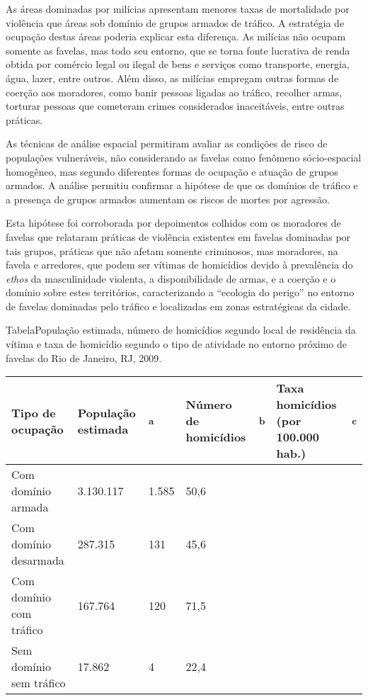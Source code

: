 \documentclass{article}
\begin{document}
As áreas dominadas por milícias apresentam menores taxas de mortalidade por
violência que áreas sob domínio de grupos armados de tráfico. A estratégia de
ocupação destas áreas poderia explicar esta diferença. As milícias não ocupam
somente as favelas, mas todo seu entorno, que se torna fonte lucrativa de renda
obtida por comércio legal ou ilegal de bens e serviços como transporte, energia,
água, lazer, entre outros. Além disso, as milícias empregam outras formas de
coerção aos moradores, como banir pessoas ligadas ao tráfico, recolher armas,
torturar pessoas que cometeram crimes considerados inaceitáveis, entre outras
práticas.

As técnicas de análise espacial permitiram avaliar as condições de risco de
populações vulneráveis, não considerando as favelas como fenômeno sócio-espacial
homogêneo, mas segundo diferentes formas de ocupação e atuação de grupos
armados. A análise permitiu confirmar a hipótese de que os domínios de tráfico e
a presença de grupos armados aumentam os riscos de mortes por agressão.

Esta hipótese foi corroborada por depoimentos colhidos com os moradores de
favelas que relataram práticas de violência existentes em favelas dominadas por
tais grupos, práticas que não afetam somente criminosos, mas moradores, na
favela e arredores, que podem ser vítimas de homicídios devido à prevalência do
\textit{ethos}
da masculinidade violenta, a disponibilidade de armas, e a coerção e o domínio
sobre estes territórios, caracterizando a “ecologia do perigo” no entorno de
favelas dominadas pelo tráfico e localizadas em zonas estratégicas da cidade.

TabelaPopulação estimada, número de homicídios segundo local de residência da
vítima e taxa de homicídio segundo o tipo de atividade no entorno próximo de
favelas do Rio de Janeiro, RJ, 2009.
\begin{table}
\begin{xtabular}{ l | l | l | l | l | l | l }
\hline
Tipo de ocupação & População estimada & \textsuperscript{a}
& Número de homicídios & \textsuperscript{b}
& Taxa homicídios (por 100.000 hab.) & \textsuperscript{c}
\\ \hline
Com domínio armada
& 3.130.117
& 1.585
& 50,6
\\ \hline

Com domínio desarmada
& 287.315
& 131
& 45,6
\\ \hline

Com domínio com tráfico
& 167.764
& 120
& 71,5
\\ \hline

Sem domínio sem tráfico
& 17.862
& 4
& 22,4
\\ \hline

\end{xtabular}
\end{table}
\end{document}
